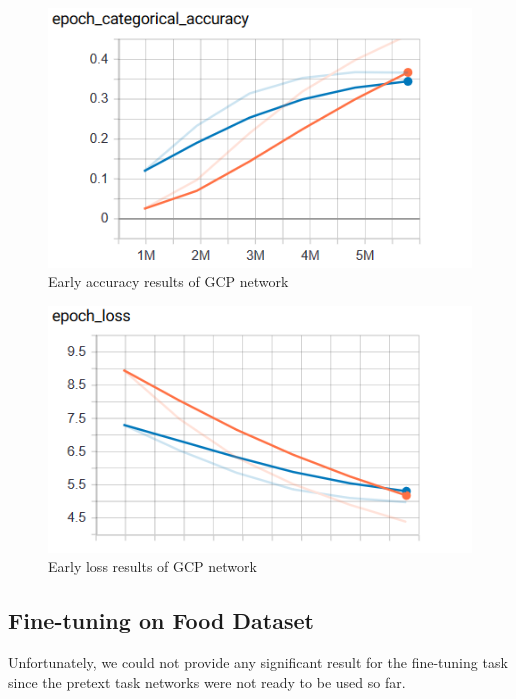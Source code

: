 \begin{figure}[!ht]
    \centering
    \includegraphics[scale=0.60]{images/GCP_early_accuracy.png}
    \caption{Early accuracy results of GCP network}
    \label{fig:early_GCP_acc}
\end{figure}
\begin{figure}[!ht]
    \centering
    \includegraphics[scale=0.60]{images/GCP_early_loss.png}
    \caption{Early loss results of GCP network}
    \label{fig:early_GCP_loss}
\end{figure}


\subsection{Fine-tuning on Food Dataset}
Unfortunately, we could not provide any significant result for the fine-tuning task since the pretext task networks were not ready to be used so far.


